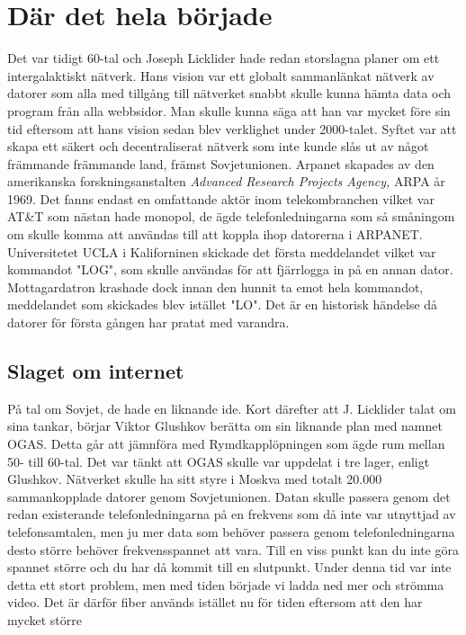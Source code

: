 \documentclass[a4paper,11pt]{article}
\begin{document}
\section{Där det hela började}
Det var tidigt 60-tal och Joseph Licklider hade redan storslagna planer om ett
intergalaktiskt nätverk. Hans vision var ett globalt sammanlänkat nätverk av
datorer som alla med tillgång till nätverket snabbt skulle kunna hämta data och
program från alla webbsidor. Man skulle kunna säga att han var mycket före sin
tid eftersom att hans vision sedan blev verklighet under 2000-talet. Syftet var
att skapa ett säkert och decentraliserat nätverk som inte kunde slås ut av något
främmande främmande land, främst Sovjetunionen. Arpanet skapades av den
amerikanska forskningsanstalten \textit{Advanced Research Projects Agency,} ARPA
år 1969. Det fanns endast en omfattande aktör inom telekombranchen vilket var
AT\&T som nästan hade monopol, de ägde telefonledningarna som så småningom om
skulle komma att användas till att koppla ihop datorerna i ARPANET.
Universitetet UCLA i Kaliforninen skickade det första meddelandet vilket var
kommandot "LOG", som skulle användas för att fjärrlogga in på en annan dator.
Mottagardatron krashade dock innan den hunnit ta emot hela kommandot,
meddelandet som skickades blev istället "LO". Det är en historisk händelse då
datorer för första gången har pratat med varandra.

\subsection{Slaget om internet}
På tal om Sovjet, de hade en liknande ide. Kort därefter att J. Licklider talat
om sina tankar, börjar Viktor Glushkov berätta om sin liknande plan med namnet
OGAS. Detta går att jämnföra med Rymdkapplöpningen som ägde rum mellan 50- till
60-tal. Det var tänkt att OGAS skulle var uppdelat i tre lager, enligt Glushkov.
Nätverket skulle ha sitt styre i Moskva med totalt 20.000 sammankopplade datorer
genom Sovjetunionen. Datan skulle passera genom det redan existerande
telefonledningarna på en frekvens som då inte var utnyttjad av telefonsamtalen,
men ju mer data som behöver passera genom telefonledningarna desto större
behöver frekvensspannet att vara. Till en viss punkt kan du inte göra spannet
större och du har då kommit till en slutpunkt. Under denna tid var inte detta
ett stort problem, men med tiden började vi ladda ned mer och strömma video. Det
är därför fiber används istället nu för tiden eftersom att den har mycket större
\end{document}
